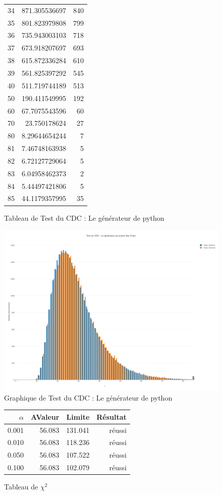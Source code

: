 \documentclass[10pt,a4paper]{article}
\begin{document}
\begin{figure}[h]
\begin{tabular}{|r|r|r|}
34 & 871.305536697 & 840\\
35 & 801.823979808 & 799\\
36 & 735.943003103 & 718\\
37 & 673.918207697 & 693\\
38 & 615.872336284 & 610\\
39 & 561.825397292 & 545\\
40 & 511.719744189 & 513\\
50 & 190.411549995 & 192\\
60 & 67.7075543596 & 60\\
70 & 23.750178624 & 27\\
80 & 8.29644654244 & 7\\
81 & 7.46748163938 & 5\\
82 & 6.72127729064 & 5\\
83 & 6.04958462373 & 2\\
84 & 5.44497421806 & 5\\
85 & 44.1179357995 & 35\\
\hline
\end{tabular}
\caption{Tableau de Test du CDC : Le générateur de python }
\end{figure}
\newpage

\begin{figure}[h]
\centering
\includegraphics[scale=0.25]{../chart_images/cdc_py.png}
\caption{Graphique de Test du CDC : Le générateur de python}
\end{figure}

\begin{figure}[h]
\centering
\begin{tabular}{|r|r|r|r|}
\hline
$\alpha$ & AValeur & Limite & Résultat\\
\hline
0.001 & 56.083 & 131.041 & réussi\\
0.010 & 56.083 & 118.236 & réussi\\
0.050 & 56.083 & 107.522 & réussi\\
0.100 & 56.083 & 102.079 & réussi\\
\hline
\end{tabular}
\caption{Tableau de $\chi^2$}
\end{figure}
    
\end{document}
